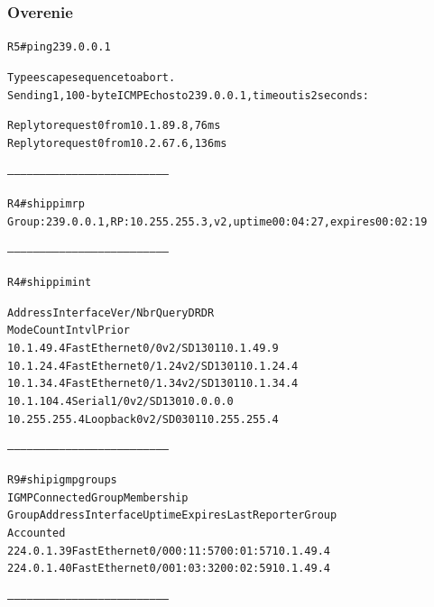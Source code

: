 \documentclass[12pt,twoside,a4paper]{report}
\begin{document}
\subsubsection{Overenie}

\noindent
{\selectfont
\begin{small}
\begin{alltt}
R5#ping 239.0.0.1

Type escape sequence to abort.
Sending 1, 100-byte ICMP Echos to 239.0.0.1, timeout is 2 seconds:

Reply to request 0 from 10.1.89.8, 76 ms
Reply to request 0 from 10.2.67.6, 136 ms


---------------------------------------------------------------------------


R4#sh ip pim rp
Group: 239.0.0.1, RP: 10.255.255.3, v2, uptime 00:04:27, expires 00:02:19


---------------------------------------------------------------------------


R4#sh ip pim int

Address          Interface            Ver/   Nbr    Query  DR     DR
                                      Mode   Count  Intvl  Prior
10.1.49.4        FastEthernet0/0      v2/SD  1      30     1      10.1.49.9
10.1.24.4        FastEthernet0/1.24   v2/SD  1      30     1      10.1.24.4
10.1.34.4        FastEthernet0/1.34   v2/SD  1      30     1      10.1.34.4
10.1.104.4       Serial1/0            v2/SD  1      30     1      0.0.0.0
10.255.255.4     Loopback0            v2/SD  0      30     1      10.255.255.4


---------------------------------------------------------------------------


R9#sh ip igmp groups
IGMP Connected Group Membership
Group Address  Interface        Uptime    Expires   Last Reporter   Group
                                                                    Accounted
224.0.1.39     FastEthernet0/0  00:11:57  00:01:57  10.1.49.4
224.0.1.40     FastEthernet0/0  01:03:32  00:02:59  10.1.49.4


---------------------------------------------------------------------------

\end{alltt}
\end{small}
}
\end{document}
